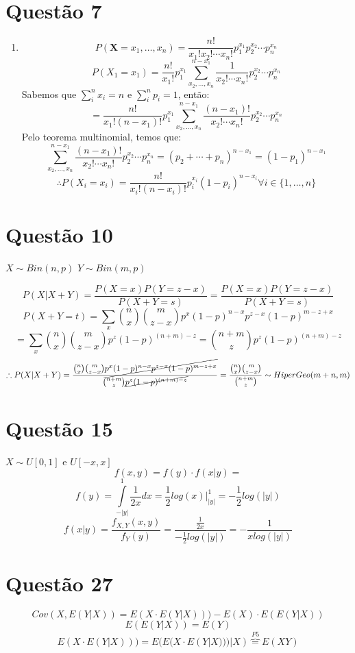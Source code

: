 \documentclass[a4paper,12pt]{report}
\begin{document}
\section{Questão 7}
\begin{enumerate}[label=\alph*)]
	\item 

$$	P(\bm X = x_1,\ldots,x_n) =\frac{n!}{x_1!x_2!\cdots  x_n!}p_1^{x_1} p_2^{x_2}\cdots p_n^{x_n} $$
$$P(X_1=x_1)= \frac{n!}{x_1!}p_1^{x_1} \sum\limits_{x_2,\ldots,x_n}^{n-x_1}\frac{1}{x_2!\cdots  x_n!}p_2^{x_2}\cdots p_n^{x_n}   $$
Sabemos que $\sum\limits_i^n x_i = n$ e $\sum\limits_i^n p_i=1$, então:
$$= \frac{n!}{x_1!(n-x_1)!}p_1^{x_1} \sum\limits_{x_2,\ldots,x_n}^{n-x_1}\frac{(n-x_1)!}{x_2!\cdots  x_n!}p_2^{x_2}\cdots p_n^{x_n}  $$
Pelo teorema multinomial, temos que:
$$ \sum\limits_{x_2,\ldots,x_n}^{n-x_1}\frac{(n-x_1)!}{x_2!\cdots  x_n!}p_2^{x_2}\cdots p_n^{x_n}  = (p_2+\cdots+p_n)^{n-x_1}
= ( 1 - p_1)^{n-x_1}$$
$$\therefore P(X_i=x_i) =   \frac{n!}{x_i!(n-x_i)!}p_i^{x_i}( 1 - p_i)^{n-x_i}\forall i \in \{1,\ldots,n\} $$
\end{enumerate}
\newpage 

\section{Questão 10}
$X\sim Bin(n,p) $ $Y\sim Bin(m,p)$

$$P(X|X+Y)  =\frac{P(X=x) P(Y=z-x)}{P(X+Y=s)} = \frac{P(X=x)P(Y=z-x)}{P(X+Y=s)}$$
$$P(X+Y=t) = \sum\limits_x \binom{n}{x} \binom{m}{z-x} p^{x}(1-p)^{n-x} p^{z-x}(1-p)^{m-z+x}$$
$$=\sum\limits_x \binom{n}{x}\binom{m}{z-x} p^z (1-p)^{(n+m)-z}  =\binom{n+m}{z} p^z (1-p)^{(n+m)-z} $$
$$\therefore P(X|X+Y) = \frac{\binom{n}{x} \binom{m}{z-x} \cancel{p^{x}(1-p)^{n-x} p^{z-x}(1-p)^{m-z+x}}}{\binom{n+m}{z}\cancel{ p^z (1-p)^{(n+m)-z}}}  = \frac{\binom{n}{x}\binom{m}{z-x}}{\binom{n+m}{z}}\sim HiperGeo(m+n,m)$$
\section{Questão 15}
$X\sim U[0,1]$ e $U[-x,x]$
$$f(x,y) = f(y)\cdot f(x|y) =$$
$$f(y) = \int\limits_{-|y|}^1 \frac{1}{2x}dx = \frac{1}{2}log(x) \bigg|^{1}_{|y|} = -\frac{1}{2} log(|y|)$$
$$f(x|y)= \frac{f_{X,Y}(x,y)}{f_Y(y)} = \frac{\frac{1}{2x}}{-\frac{1}{2} log(|y|)} =- \frac{1}{xlog(|y|)} $$

\newpage 
\section{Questão 27}
$$Cov(X,E(Y|X)) = E(X\cdot E(Y|X))) - E(X)\cdot E(E(Y|X)) $$
\begin{equation}
E(E(Y|X)) = E(Y)
\end{equation}
\begin{equation}
E(X\cdot E(Y|X))) = E(E(X\cdot E(Y|X)))|X) \overbrace{=}^{P5} E(XY)
\end{equation}
\end{document}
